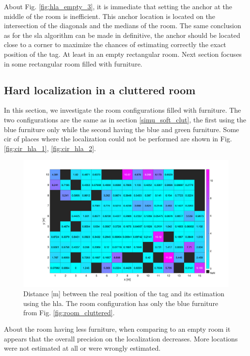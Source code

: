 About Fig. \ref{fig:hla_empty_3}, it is immediate that setting the anchor at the middle of the room is inefficient. This anchor location is located on the intersection of the diagonals and the medians of the room. The same conclusion as for the \gls{sla} algorithm can be made in definitive, the anchor should be located close to a corner to maximize the chances of estimating correctly the exact position of the tag. At least in an empty rectangular room. Next section focuses in some rectangular room filled with furniture.


\subsection{Hard localization in a cluttered room}

In this section, we investigate the room configurations filled with furniture. The two configurations are the same as in section \ref{simu_soft_clut}, the first using the blue furniture only while the second having the blue and green furniture. Some \gls{cir} of places where the localization could not be performed are shown in Fig. \ref{fig:cir_hla_1}, \ref{fig:cir_hla_2}.

\begin{figure}[H]
\centering
\includegraphics[width=.9\linewidth]{Images/hla_images/anchor_clut_(3_1).png}
\caption{Distance [m] between the real position of the tag and its estimation using the \gls{hla}. The room configuration has only the blue furniture from Fig. \ref{fig:room_cluttered}.\label{fig:hla_little_clut}}
\end{figure}

About the room having less furniture, when comparing to an empty room it appears that the overall precision on the localization decreases. More locations were not estimated at all or were wrongly estimated.

